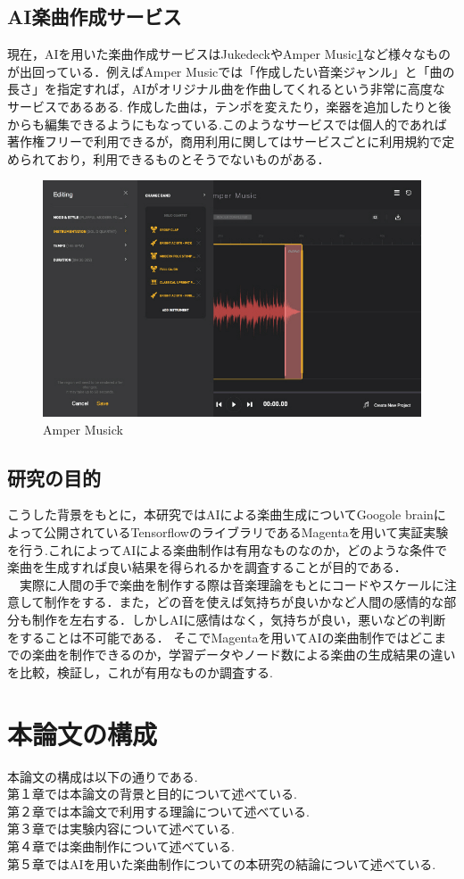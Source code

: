 \subsection{AI楽曲作成サービス}
現在，AIを用いた楽曲作成サービスはJukedeck\cite{webpage10}やAmper Music\ref{fig:Amper Music}\cite{webpage11}など様々なものが出回っている．例えばAmper Musicでは「作成したい音楽ジャンル」と「曲の長さ」を指定すれば，AIがオリジナル曲を作曲してくれるという非常に高度なサービスであるある. 
作成した曲は，テンポを変えたり，楽器を追加したりと後からも編集できるようにもなっている.このようなサービスでは個人的であれば著作権フリーで利用できるが，商用利用に関してはサービスごとに利用規約で定められており，利用できるものとそうでないものがある．\\
\begin{figure}[!ht]
    \begin{screen}
    \begin{center}
        \includegraphics[scale=0.8, clip]{./img/Amper1.jpg}
        \caption{Amper Musick}
        \label{fig:Amper Music}
    \end{center}
\end{screen}
\end{figure}
\newpage
\subsection{研究の目的}
こうした背景をもとに，本研究ではAIによる楽曲生成についてGoogole brainによって公開されているTensorflowのライブラリであるMagentaを用いて実証実験を行う.これによってAIによる楽曲制作は有用なものなのか，どのような条件で楽曲を生成すれば良い結果を得られるかを調査することが目的である．\\
　実際に人間の手で楽曲を制作する際は音楽理論をもとにコードやスケールに注意して制作をする．また，どの音を使えば気持ちが良いかなど人間の感情的な部分も制作を左右する．しかしAIに感情はなく，気持ちが良い，悪いなどの判断をすることは不可能である．
そこでMagentaを用いてAIの楽曲制作ではどこまでの楽曲を制作できるのか，学習データやノード数による楽曲の生成結果の違いを比較，検証し，これが有用なものか調査する.\\
\newpage
\section{本論文の構成}
本論文の構成は以下の通りである.\\
第１章では本論文の背景と目的について述べている.\\
第２章では本論文で利用する理論について述べている.\\
第３章では実験内容について述べている.\\
第４章では楽曲制作について述べている.\\
第５章ではAIを用いた楽曲制作についての本研究の結論について述べている.\\